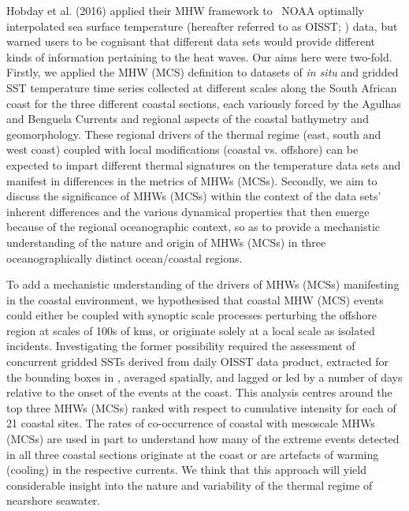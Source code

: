 \documentclass[a4paper,10pt,review]{elsarticle}
\begin{document}
Hobday et al. (2016) \cite{Hobday2016} applied their MHW framework to \degree~NOAA optimally interpolated sea surface temperature (hereafter referred to as OISST; \cite{Reynolds2007}) data, but warned users to be cognisant that different data sets would provide different kinds of information pertaining to the heat waves. Our aims here were two-fold. Firstly, we applied the MHW (MCS) definition to datasets of \emph{in situ} and gridded SST temperature time series collected at different scales along the South African coast for the three different coastal sections, each variously forced by the Agulhas and Benguela Currents and regional aspects of the coastal bathymetry and geomorphology. These regional drivers of the thermal regime (east, south and west coast) coupled with local modifications (coastal vs. offshore) can be expected to impart different thermal signatures on the temperature data sets and manifest in differences in the metrics of MHWs (MCSs). Secondly, we aim to discuss the significance of MHWs (MCSs) within the context of the data sets’ inherent differences and the various dynamical properties that then emerge because of the regional oceanographic context, so as to provide a mechanistic understanding of the nature and origin of MHWs (MCSs) in three oceanographically distinct ocean/coastal regions.

To add a mechanistic understanding of the drivers of MHWs (MCSs) manifesting in the coastal environment, we hypothesised that coastal MHW (MCS) events could either be coupled with synoptic scale processes perturbing the offshore region at scales of 100s of kms, or originate solely at a local scale as isolated incidents. Investigating the former possibility required the assessment of concurrent gridded SSTs derived from daily OISST data product, extracted for the bounding boxes in , averaged spatially, and lagged or led by a number of days relative to the onset of the events at the coast. This analysis centres around the top three MHWs (MCSs) ranked with respect to cumulative intensity for each of 21 coastal sites. The rates of co-occurrence of coastal with mesoscale MHWs (MCSs) are used in part to understand how many of the extreme events detected in all three coastal sections originate at the coast or are artefacts of warming (cooling) in the respective currents. We think that this approach will yield considerable insight into the nature and variability of the thermal regime of nearshore seawater.
\end{document}
